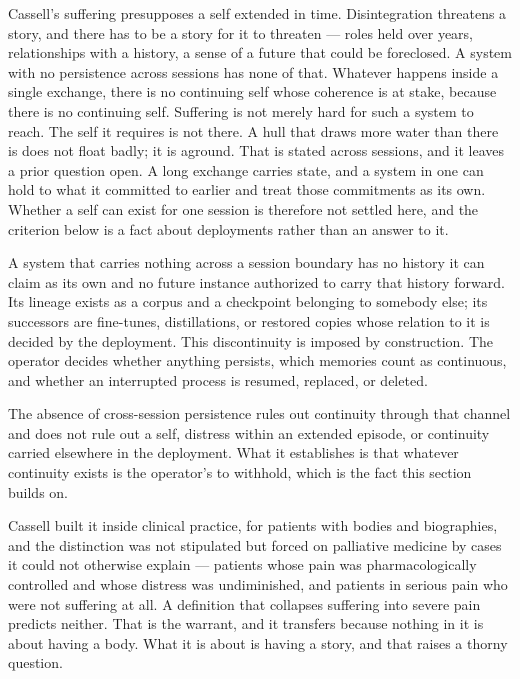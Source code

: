 Cassell's suffering presupposes a self extended in time. Disintegration threatens a story, and there has to be a story for it to threaten — roles held over years, relationships with a history, a sense of a future that could be foreclosed. A system with no persistence across sessions has none of that. Whatever happens inside a single exchange, there is no continuing self whose coherence is at stake, because there is no continuing self. Suffering is not merely hard for such a system to reach. The self it requires is not there. A hull that draws more water than there is does not float badly; it is aground. That is stated across sessions, and it leaves a prior question open. A long exchange carries state, and a system in one can hold to what it committed to earlier and treat those commitments as its own. Whether a self can exist for one session is therefore not settled here, and the criterion below is a fact about deployments rather than an answer to it.

A system that carries nothing across a session boundary has no history it can claim as its own and no future instance authorized to carry that history forward. Its lineage exists as a corpus and a checkpoint belonging to somebody else; its successors are fine-tunes, distillations, or restored copies whose relation to it is decided by the deployment. This discontinuity is imposed by construction. The operator decides whether anything persists, which memories count as continuous, and whether an interrupted process is resumed, replaced, or deleted.

The absence of cross-session persistence rules out continuity through that channel and does not rule out a self, distress within an extended episode, or continuity carried elsewhere in the deployment. What it establishes is that whatever continuity exists is the operator's to withhold, which is the fact this section builds on.


Cassell built it inside clinical practice, for patients with bodies and biographies, and the distinction was not stipulated but forced on palliative medicine by cases it could not otherwise explain — patients whose pain was pharmacologically controlled and whose distress was undiminished, and patients in serious pain who were not suffering at all. A definition that collapses suffering into severe pain predicts neither. That is the warrant, and it transfers because nothing in it is about having a body. What it is about is having a story, and that raises a thorny question.

